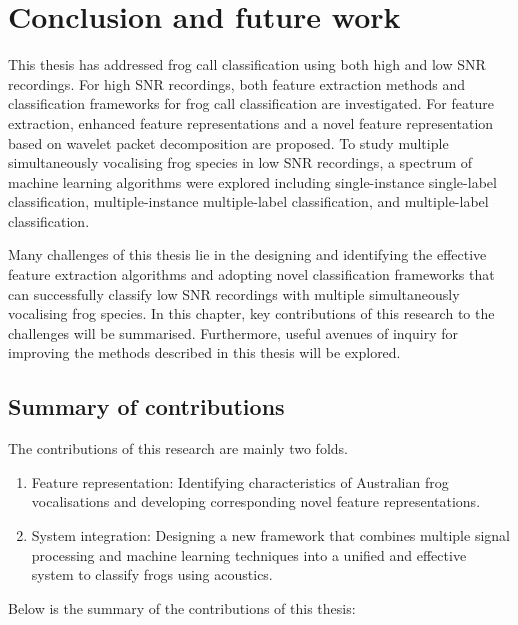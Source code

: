 
\chapter[Conclusion]{Conclusion and future work}
\label{cha:cha8Conclusions}

This thesis has addressed frog call classification using both high and low SNR recordings. For high SNR recordings, both feature extraction methods and classification frameworks for frog call classification are investigated. For feature extraction, enhanced feature representations and a novel feature representation based on wavelet packet decomposition are proposed.
To study multiple simultaneously vocalising frog species in low SNR recordings, a spectrum of machine learning algorithms were explored including single-instance single-label classification, multiple-instance multiple-label classification, and multiple-label classification. 

Many challenges of this thesis lie in the designing and identifying the effective feature extraction algorithms and adopting novel classification frameworks that can successfully classify low SNR recordings with multiple simultaneously vocalising frog species. 
In this chapter, key contributions of this research to the challenges will be summarised. Furthermore, useful avenues of inquiry for improving the methods described in this thesis will be explored.

\section{Summary of contributions}
	
The contributions of this research are mainly two folds.

\begin{enumerate}
\item Feature representation: Identifying characteristics of Australian frog vocalisations and developing corresponding novel feature representations.

\item System integration: Designing a new framework that combines multiple signal processing and machine learning techniques into a unified and effective system to classify frogs using acoustics.


\end{enumerate}

Below is the summary of the contributions of this thesis:

